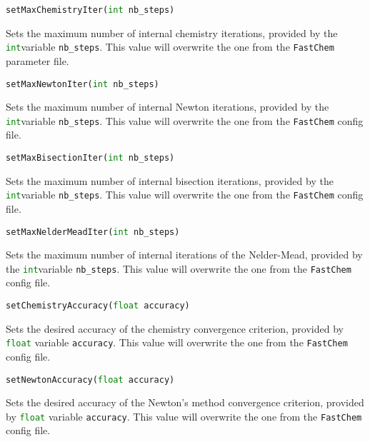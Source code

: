 \documentclass[numbers=noenddot]{aux/fcmanual}
\newcommand{\fc}{\texttt{FastChem}\xspace}
\begin{document}
\bigbreak

\lstinline[language=Python]!setMaxChemistryIter(int nb_steps)!
\begin{addmargin}[25pt]{0pt}
	Sets the maximum number of internal chemistry iterations, provided by the \lstinline[language=Python]!int!\footnotemark[\value{footnote}] variable \lstinline!nb_steps!. This value will overwrite the one from the \fc parameter file.
\end{addmargin}

\bigbreak

\lstinline[language=Python]!setMaxNewtonIter(int nb_steps)!
\begin{addmargin}[25pt]{0pt}
	Sets the maximum number of internal Newton iterations, provided by the \lstinline[language=Python]!int!\footnotemark[\value{footnote}] variable \lstinline!nb_steps!. This value will overwrite the one from the \fc config file.
\end{addmargin}

\bigbreak

\lstinline[language=Python]!setMaxBisectionIter(int nb_steps)!
\begin{addmargin}[25pt]{0pt}
	Sets the maximum number of internal bisection iterations, provided by the \lstinline[language=Python]!int!\footnotemark[\value{footnote}] variable \lstinline!nb_steps!. This value will overwrite the one from the \fc config file.
\end{addmargin}

\bigbreak

\lstinline[language=Python]!setMaxNelderMeadIter(int nb_steps)!
\begin{addmargin}[25pt]{0pt}
	Sets the maximum number of internal iterations of the Nelder-Mead, provided by the \lstinline[language=Python]!int!\footnotemark[\value{footnote}] variable \lstinline!nb_steps!. This value will overwrite the one from the \fc config file.
\end{addmargin}

\bigbreak

\lstinline[language=Python]!setChemistryAccuracy(float accuracy)!
\begin{addmargin}[25pt]{0pt}
	Sets the desired accuracy of the chemistry convergence criterion, provided by \lstinline[language=Python]!float! variable \lstinline!accuracy!. This value will overwrite the one from the \fc config file.
\end{addmargin}

\bigbreak

\lstinline[language=Python]!setNewtonAccuracy(float accuracy)!
\begin{addmargin}[25pt]{0pt}
	Sets the desired accuracy of the Newton's method convergence criterion, provided by \lstinline[language=Python]!float! variable \lstinline!accuracy!. This value will overwrite the one from the \fc config file.
\end{addmargin}
\end{document}
